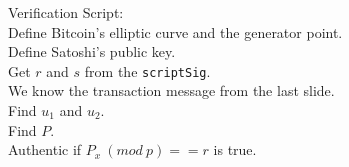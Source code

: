 \documentclass[]{beamer}
\begin{document}
\begin{frame}{Verification}
	Script:\\
	Define Bitcoin's elliptic curve and the generator point.\\
	Define Satoshi's public key.\\
	Get $r$ and $s$ from the \texttt{scriptSig}.\\
	We know the transaction message from the last slide.\\
	Find $u_1$ and $u_2$.\\
	Find $P$.\\
	Authentic if $P_x\ (mod\ p) == r$ is true.\\
\end{frame}

%
%
\end{document}
